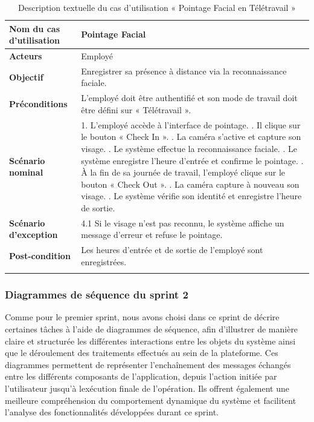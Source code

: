 \begin{center}
\begin{longtable}{|p{5cm}|p{9cm}|}
\hline
\textbf{Nom du cas d'utilisation} & \textbf{Pointage Facial} \\ \hline

\textbf{Acteurs} & Employé \\ \hline

\textbf{Objectif} & Enregistrer sa présence à distance via la reconnaissance faciale. \\ \hline

\textbf{Préconditions} & L'employé doit être authentifié et son mode de travail doit être défini sur « Télétravail ». \\ \hline

\textbf{Scénario nominal} &

1. L'employé accède à l'interface de pointage. \newline
2. Il clique sur le bouton « Check In ». \newline
3. La caméra s'active et capture son visage. \newline
4. Le système effectue la reconnaissance faciale. \newline
5. Le système enregistre l'heure d'entrée et confirme le pointage. \newline
6. À la fin de sa journée de travail, l'employé clique sur le bouton « Check Out ». \newline
7. La caméra capture à nouveau son visage. \newline
8. Le système vérifie son identité et enregistre l'heure de sortie.
   \\ \hline

\textbf{Scénario d'exception} &
4.1 Si le visage n'est pas reconnu, le système affiche un message d'erreur et refuse le pointage.
\\ \hline

\textbf{Post-condition} & Les heures d'entrée et de sortie de l'employé sont enregistrées.
\\ \hline

\caption{Description textuelle du cas d'utilisation « Pointage Facial en Télétravail »}
\end{longtable}
\end{center}

\subsubsection{Diagrammes de séquence du sprint 2}
Comme pour le premier sprint, nous avons choisi dans ce sprint de décrire certaines tâches à l’aide
de diagrammes de séquence, afin d’illustrer de manière claire et structurée les différentes interactions
entre les objets du système ainsi que le déroulement des traitements effectués au sein de la plateforme. Ces diagrammes permettent de représenter l’enchaînement des messages échangés entre les
différents composants de l’application, depuis l’action initiée par l’utilisateur jusqu’à lexécution finale de l’opération. Ils offrent également une meilleure compréhension du comportement dynamique
du système et facilitent l’analyse des fonctionnalités développées durant ce sprint.

